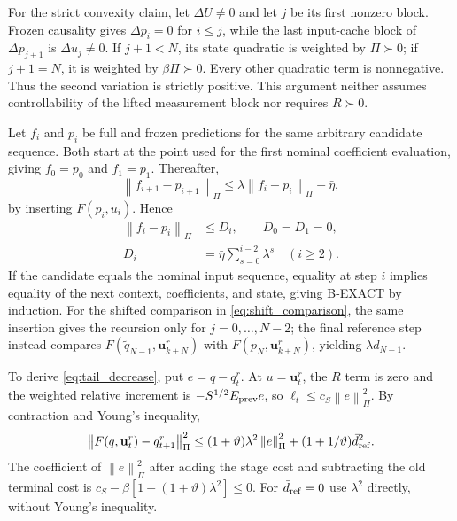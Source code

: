 \documentclass[journal]{IEEEtran}
\newcommand{\vu}{\mathbf{u}}
\newcommand{\norm}[1]{\left\lVert #1\right\rVert}
\begin{document}
For the strict convexity claim, let $\Delta U\ne0$ and let $j$ be its first nonzero block. Frozen causality gives $\Delta p_i=0$ for $i\le j$, while the last input-cache block of $\Delta p_{j+1}$ is $\Delta u_j\ne0$. If $j+1<N$, its state quadratic is weighted by $\Pi\succ0$; if $j+1=N$, it is weighted by $\beta\Pi\succ0$. Every other quadratic term is nonnegative. Thus the second variation is strictly positive. This argument neither assumes controllability of the lifted measurement block nor requires $R\succ0$.

Let $f_i$ and $p_i$ be full and frozen predictions for the same arbitrary candidate sequence. Both start at the point used for the first nominal coefficient evaluation, giving $f_0=p_0$ and $f_1=p_1$. Thereafter,
\begin{equation*}
\norm{f_{i+1}-p_{i+1}}_\Pi\le
\lambda\norm{f_i-p_i}_\Pi+\bar\eta,
\end{equation*}
by inserting $F(p_i,u_i)$. Hence
\begin{equation}
\begin{split}
\norm{f_i-p_i}_\Pi&\le D_i,\qquad D_0=D_1=0,\\
D_i&=\bar\eta\sum_{s=0}^{i-2}\lambda^s\quad(i\ge2).
\end{split}
\label{eq:frozen_discrepancy}
\end{equation}
If the candidate equals the nominal input sequence, equality at step $i$ implies equality of the next context, coefficients, and state, giving B-EXACT by induction. For the shifted comparison in \eqref{eq:shift_comparison}, the same insertion gives the recursion only for $j=0,\ldots,N-2$; the final reference step instead compares $F(\widetilde q_{N-1},\vu_{k+N}^r)$ with $F(p_N,\vu_{k+N}^r)$, yielding $\lambda d_{N-1}$.

To derive \eqref{eq:tail_decrease}, put $e=q-q_t^r$. At $u=\vu_t^r$, the $R$ term is zero and the weighted relative increment is $-S^{1/2}E_{\rm prev}e$, so $\ell_t\le c_S\norm{e}_\Pi^2$. By contraction and Young's inequality,
\begin{equation*}
\norm{F(q,\vu_t^r)-q_{t+1}^r}_\Pi^2
\le(1+\vartheta)\lambda^2\norm{e}_\Pi^2
+(1+1/\vartheta)\bar d_{\rm ref}^2.
\end{equation*}
The coefficient of $\norm{e}_\Pi^2$ after adding the stage cost and subtracting the old terminal cost is $c_S-\beta[1-(1+\vartheta)\lambda^2]\le0$. For $\bar d_{\rm ref}=0$ use $\lambda^2$ directly, without Young's inequality.
\end{document}
